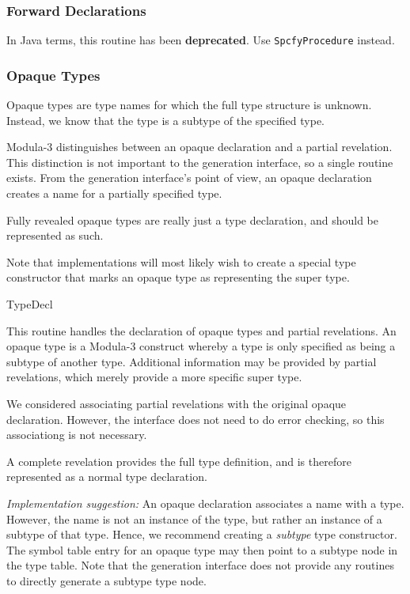 
\subsubsection{Forward Declarations}
\begin{functionality}
In Java terms, this routine has been \textbf{deprecated}.  Use
\texttt{SpcfyProcedure} instead.
\end{functionality}

\subsubsection{Opaque Types}

Opaque types are type names for which the full type structure is
unknown.  Instead, we know that the type is a subtype of the specified
type.  

Modula-3 distinguishes between an opaque declaration and a partial
revelation.  This distinction is not important to the generation
interface, so a single routine exists.  From the generation
interface's point of view, an opaque declaration creates a name for a
partially specified type.

Fully revealed opaque types are really just a type declaration, and
should be represented as such.

Note that implementations will most likely wish to create a special
type constructor that marks an opaque type as representing the super
type.

	{TypeDecl}
\begin{functionality}
This routine handles the declaration of opaque types and partial
revelations.  An opaque type is a Modula-3 construct whereby a type is
only specified as being a subtype of another type.  Additional
information may be provided by partial revelations, which merely
provide a more specific super type.  

We considered associating partial revelations with the original opaque
declaration.  However, the interface does not need to do error
checking, so this associationg is not necessary.  

A complete revelation provides the full type definition, and is
therefore represented as a normal type declaration.

\emph{Implementation suggestion:} An opaque declaration associates a
name with a type.  However, the name is not an instance of the type,
but rather an instance of a subtype of that type.  Hence, we recommend
creating a \emph{subtype} type constructor.  The symbol table entry
for an opaque type may then point to a subtype node in the type table.
Note that the generation interface does not provide any routines to
directly generate a subtype type node.
\end{functionality}

